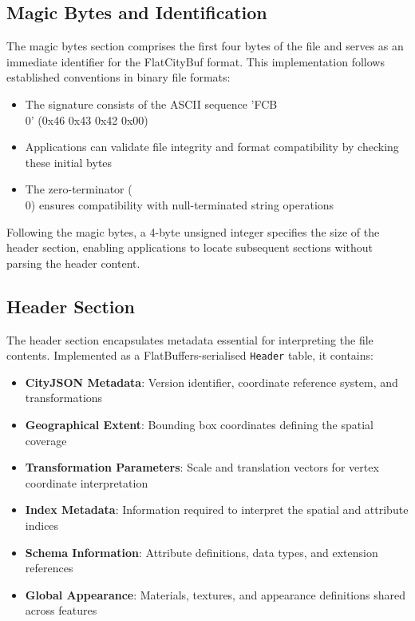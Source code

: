 \subsection{Magic Bytes and Identification}
\label{methodology:overview:magic_bytes}

The magic bytes section comprises the first four bytes of the file and serves as an immediate identifier for the FlatCityBuf format. This implementation follows established conventions in binary file formats:

\begin{itemize}
  \item The signature consists of the ASCII sequence 'FCB\\0' (0x46 0x43 0x42 0x00)
  \item Applications can validate file integrity and format compatibility by checking these initial bytes
  \item The zero-terminator (\\0) ensures compatibility with null-terminated string operations
\end{itemize}

Following the magic bytes, a 4-byte unsigned integer specifies the size of the header section, enabling applications to locate subsequent sections without parsing the header content.

\subsection{Header Section}
\label{methodology:overview:header_section}

The header section encapsulates metadata essential for interpreting the file contents. Implemented as a FlatBuffers-serialised \texttt{Header} table, it contains:

\begin{itemize}
  \item \textbf{CityJSON Metadata}: Version identifier, coordinate reference system, and transformations
  \item \textbf{Geographical Extent}: Bounding box coordinates defining the spatial coverage
  \item \textbf{Transformation Parameters}: Scale and translation vectors for vertex coordinate interpretation
  \item \textbf{Index Metadata}: Information required to interpret the spatial and attribute indices
  \item \textbf{Schema Information}: Attribute definitions, data types, and extension references
  \item \textbf{Global Appearance}: Materials, textures, and appearance definitions shared across features
\end{itemize}

